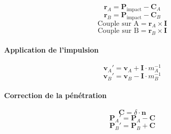 \begin{multicols}{2}
        \begin{equation}
        \mathbf{r}_A = \mathbf{P}_{\text{impact}} - \mathbf{C}_A
        \end{equation}
        \begin{equation}
        \mathbf{r}_B = \mathbf{P}_{\text{impact}} - \mathbf{C}_B
        \end{equation}
        \begin{equation}
        \text{Couple sur A} = \mathbf{r}_A \times \mathbf{I}
        \end{equation}
        \begin{equation}
        \text{Couple sur B} = \mathbf{r}_B \times \mathbf{I}
        \end{equation}
    
        \paragraph{Application de l'impulsion}
        
        \begin{equation}
        \mathbf{v}_A' = \mathbf{v}_A + \mathbf{I} \cdot m_A^{-1}
        \end{equation}
        \begin{equation}
        \mathbf{v}_B' = \mathbf{v}_B - \mathbf{I} \cdot m_B^{-1}
        \end{equation}
    
        \paragraph{Correction de la pénétration}
        
        \[
        \mathbf{C} = \delta \cdot \mathbf{n}
        \]
        \begin{equation}
        \mathbf{P}_A' = \mathbf{P}_A - \mathbf{C}
        \end{equation}
        \begin{equation}
        \mathbf{P}_B' = \mathbf{P}_B + \mathbf{C}
        \end{equation}
    

\end{multicols}
